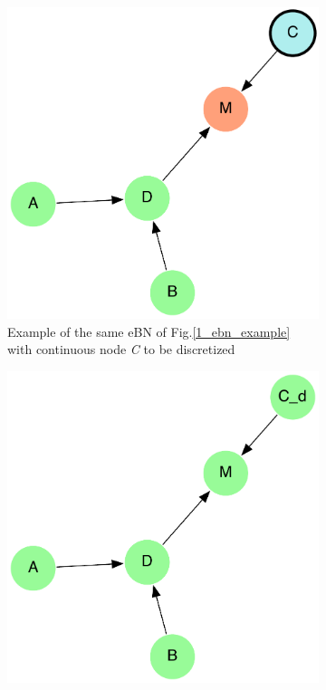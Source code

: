 \begin{figure}[h]
    \centering
    \begin{subfigure}{0.45\textwidth}
        \centering
        \includegraphics[width=\linewidth]{imgs/pdfs/3_d_ebn.pdf}
        \caption{Example of the same eBN of Fig.\ref{1_ebn_example} with continuous node \textit{C} to be discretized}\label{1_ebn_disc_example}
    \end{subfigure}
    \hfill
    \begin{subfigure}{0.45\textwidth}
        \centering
        \includegraphics[width=\linewidth]{imgs/pdfs/4_d_rbn.pdf}

\end{subfigure}
\end{figure}

